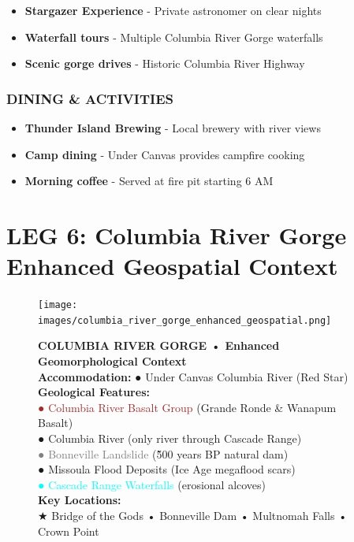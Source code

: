 \documentclass[
  11pt,
]{article}
\providecommand{\tightlist}{%
  \setlength{\itemsep}{0pt}\setlength{\parskip}{0pt}}
\begin{document}
\begin{itemize}
\tightlist
\item
  \textbf{\textcolor{secondary}{Stargazer Experience}} - Private
  astronomer on clear nights
\item
  \textbf{\textcolor{secondary}{Waterfall tours}} - Multiple Columbia
  River Gorge waterfalls\\
\item
  \textbf{\textcolor{secondary}{Scenic gorge drives}} - Historic
  Columbia River Highway
\end{itemize}

\subsubsection{\texorpdfstring{\textcolor{primary}{DINING \& ACTIVITIES}}{}}\label{section-44}

\begin{itemize}
\tightlist
\item
  \textbf{\textcolor{secondary}{Thunder Island Brewing}} - Local brewery
  with river views
\item
  \textbf{\textcolor{secondary}{Camp dining}} - Under Canvas provides
  campfire cooking\\
\item
  \textbf{\textcolor{secondary}{Morning coffee}} - Served at fire pit
  starting 6 AM
\end{itemize}

\newpage

\section{\texorpdfstring{\textcolor{primary}{LEG 6: Columbia River Gorge Enhanced Geospatial Context}}{}}\label{section-45}

\begin{figure}[H]
\centering
\texttt{[image: images/columbia\_river\_gorge\_enhanced\_geospatial.png]}
\caption{\textbf{\textcolor{primary}{COLUMBIA RIVER GORGE • Enhanced Geomorphological Context}} \\ 
\textbf{\textcolor{secondary}{Accommodation:}} \textcolor{mapred}{●} Under Canvas Columbia River (Red Star) \\
\textbf{\textcolor{secondary}{Geological Features:}} \\
\textcolor{brown}{●} \textcolor{brown}{Columbia River Basalt Group} (Grande Ronde \& Wanapum Basalt) \\
\textcolor{mapblue}{●} \textcolor{mapblue}{Columbia River} (only river through Cascade Range) \\
\textcolor{gray}{●} \textcolor{gray}{Bonneville Landslide} (\~500 years BP natural dam) \\
\textcolor{mapgreen}{●} \textcolor{mapgreen}{Missoula Flood Deposits} (Ice Age megaflood scars) \\
\textcolor{cyan}{●} \textcolor{cyan}{Cascade Range Waterfalls} (erosional alcoves) \\
\textbf{\textcolor{secondary}{Key Locations:}} \\
\textcolor{mapred}{★} Bridge of the Gods • Bonneville Dam • Multnomah Falls • Crown Point}
\end{figure}
\end{document}
